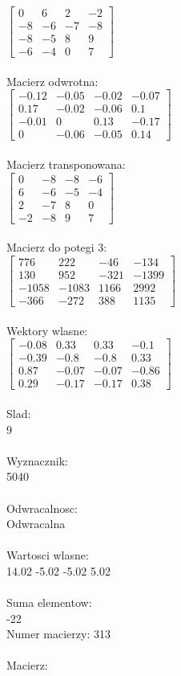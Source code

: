 \documentclass[a4paper,12pt]{article}
\begin{document}
$\begin{bmatrix} 0&6&2&-2\\-8&-6&-7&-8\\-8&-5&8&9\\-6&-4&0&7 \end{bmatrix}$
\\
\\
Macierz odwrotna:\\

$\begin{bmatrix} -0.12&-0.05&-0.02&-0.07\\0.17&-0.02&-0.06&0.1\\-0.01&0&0.13&-0.17\\0&-0.06&-0.05&0.14 \end{bmatrix}$
\\
\\
Macierz transponowana:\\

$\begin{bmatrix} 0&-8&-8&-6\\6&-6&-5&-4\\2&-7&8&0\\-2&-8&9&7 \end{bmatrix}$
\\
\\
Macierz do potegi 3:\\

$\begin{bmatrix} 776&222&-46&-134\\130&952&-321&-1399\\-1058&-1083&1166&2992\\-366&-272&388&1135 \end{bmatrix}$
\\
\\
Wektory wlasne:\\

$\begin{bmatrix} -0.08&0.33&0.33&-0.1\\-0.39&-0.8&-0.8&0.33\\0.87&-0.07&-0.07&-0.86\\0.29&-0.17&-0.17&0.38 \end{bmatrix}$
\\
\\
Slad:\\
9
\\
\\
Wyznacznik:\\
5040
\\
\\
Odwracalnosc:\\
Odwracalna
\\
\\
Wartosci wlasne:\\
14.02 -5.02 -5.02 5.02
\\
\\
Suma elementow:\\
-22
\\
\newpage
Numer macierzy:
313
\\
\\
Macierz:\\
\end{document}

